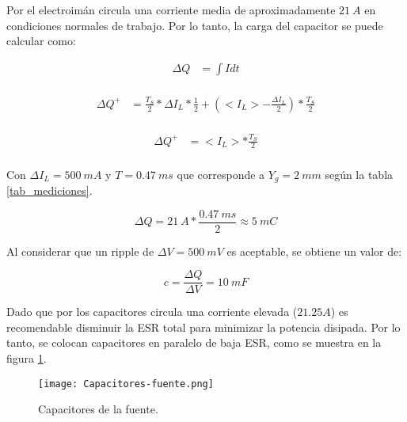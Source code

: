 \noindent Por el electroimán circula una corriente media de aproximadamente $21\:A$ en condiciones normales de trabajo. Por lo tanto, la carga del capacitor se puede calcular como:

\begin{equation} 
	\begin{aligned}
		\Delta Q &= \int I dt\\	
	\end{aligned}
\end{equation}

\begin{equation} 
	\begin{aligned}
		\Delta Q ^+ &= \frac{T_S}{2}*\Delta I_L * \frac{1}{2} + (<I_L> -\frac{\Delta I_L}{2})*\frac{T_S}{2}\\
	\end{aligned}
\end{equation}

\begin{equation} 
	\begin{aligned}
		\Delta Q ^+ &= <I_L> *\frac{T_S}{2}\\
	\end{aligned}
\end{equation}

\noindent Con $\Delta I_L=500 \:mA$ y $T=0.47\:ms$ que corresponde a $Y_g = 2 \:mm$ según la tabla \ref{tab_mediciones}.

\begin{equation} 
	\Delta Q = 21\:A * \frac{0.47\:ms}{2} \approx 5\:mC
\end{equation}

\noindent Al considerar que un ripple de $\Delta V=500 \:mV$ es aceptable, se obtiene un valor de:

\begin{equation} 
	c = \frac{\Delta Q}{\Delta V} = 10 \:mF
\end{equation}

\noindent Dado que por los capacitores circula una corriente elevada ($21.25 A$) es recomendable disminuir la ESR total para minimizar la potencia disipada. Por lo tanto, se colocan capacitores en paralelo de baja ESR, como se muestra en la figura \ref{fig:img_capacitores-fuente}.

\begin{figure}[H]
	\centering
	\texttt{[image: Capacitores-fuente.png]}
	\caption{Capacitores de la fuente.}
	\label{fig:img_capacitores-fuente}
\end{figure}


